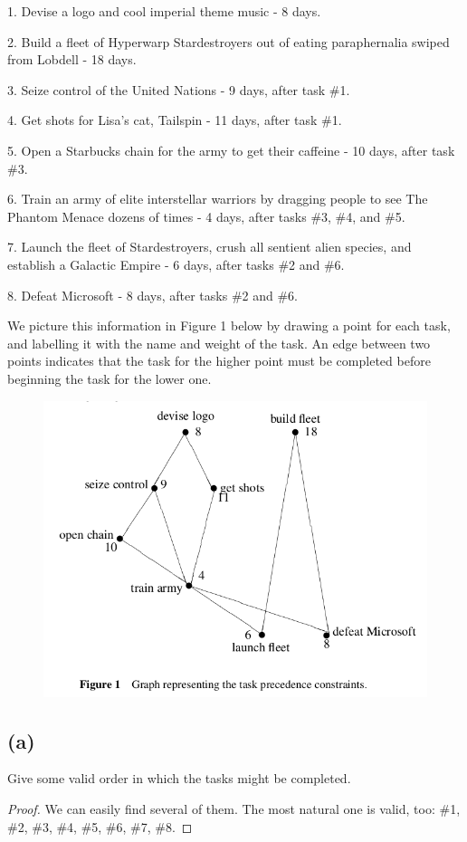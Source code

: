 \documentclass[14pt]{extarticle}
\begin{document}
1. Devise a logo and cool imperial theme music - 8 days.

2. Build a fleet of Hyperwarp Stardestroyers out of eating paraphernalia swiped from Lobdell - 18 days.

3. Seize control of the United Nations - 9 days, after task \#1.

4. Get shots for Lisa’s cat, Tailspin - 11 days, after task \#1.

5. Open a Starbucks chain for the army to get their caffeine - 10 days, after task \#3.

6. Train an army of elite interstellar warriors by dragging people to see The Phantom Menace dozens of times - 4 days, after tasks \#3, \#4, and \#5.

7. Launch the fleet of Stardestroyers, crush all sentient alien species, and establish a Galactic Empire - 6 days, after tasks \#2 and \#6.

8. Defeat Microsoft - 8 days, after tasks \#2 and \#6.

We picture this information in Figure 1 below by drawing a point for each task, and labelling it with the name and weight of the task. An edge between two points indicates that the task for the higher point must be completed before beginning the task for the lower one.

\begin{figure}[ht!]
\centering
\includegraphics[scale=0.5]{precedence.png}
\end{figure}

\subsection{(a)}
Give some valid order in which the tasks might be completed.
\begin{proof}
We can easily find several of them. The most natural one is valid, too: \#1, \#2, \#3, \#4, \#5, \#6, \#7, \#8.
\end{proof}
\end{document}
